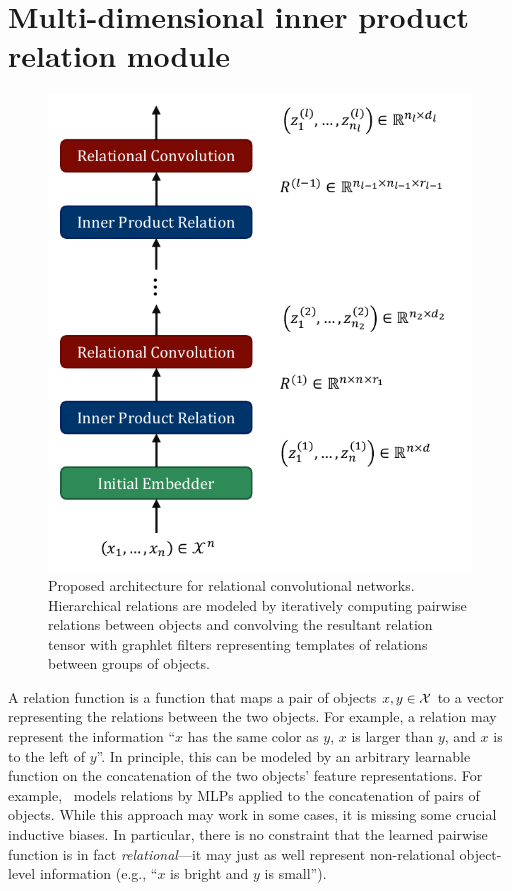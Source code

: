 \section{Multi-dimensional inner product relation module}\label{sec:mdipr}

\begin{figure}[t]
    \centering
    \includegraphics[width=.4\textwidth]{figs/relconv_architecture.pdf}
    \vskip-12pt
    \caption{Proposed architecture for relational convolutional networks. Hierarchical relations are modeled by iteratively computing pairwise relations between objects and convolving the resultant relation tensor with graphlet filters representing templates of relations between groups of objects.
    }\label{fig:relconv_architecture}
    \vskip-12pt
\end{figure}

A relation function is a function that maps a pair of objects $x, y \in {\mathcal{X}}$ to a vector representing the relations between the two objects. For example, a relation may represent the information ``$x$ has the same color as $y$, $x$ is larger than $y$, and $x$ is to the left of $y$''. In principle, this can be modeled by an arbitrary learnable function on the concatenation of the two objects' feature representations. For example,~\cite{santoroSimpleNeural2017} models relations by MLPs applied to the concatenation of pairs of objects. While this approach may work in some cases, it is missing some crucial inductive biases. In particular, there is no constraint that the learned pairwise function is in fact \textit{relational}---it may just as well represent non-relational object-level information (e.g., ``$x$ is bright and $y$ is small'').%

